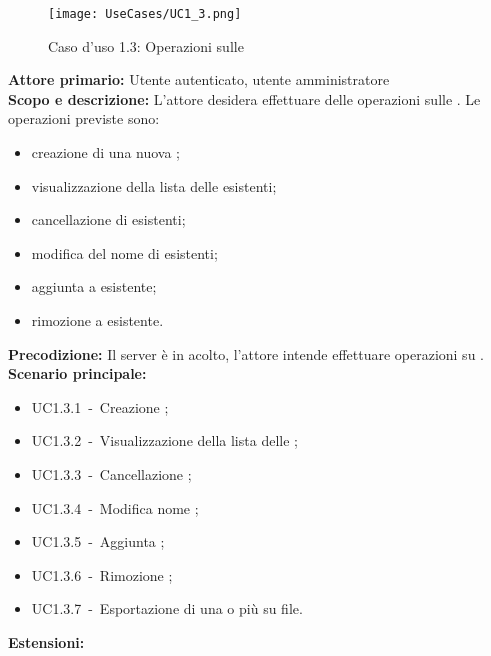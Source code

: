 \documentclass{scalatekids-article}
\begin{document}
\begin{figure}[H]
  \begin{center}
    \texttt{[image: UseCases/UC1\_3.png]}
    \caption{Caso d'uso 1.3: Operazioni sulle }
  \end{center}
\end{figure}
\textbf{Attore primario:} Utente autenticato, utente amministratore\\
\textbf{Scopo e descrizione:} L'attore desidera effettuare delle operazioni sulle . Le operazioni previste sono:
\begin{itemize}
\item creazione di una nuova ;
\item visualizzazione della lista delle  esistenti;
\item cancellazione di  esistenti;
\item modifica del nome di  esistenti;
\item aggiunta  a  esistente;
\item rimozione  a  esistente.
\end{itemize}
\textbf{Precodizione:} Il server è in acolto, l'attore intende effettuare operazioni su .\\
\textbf{Scenario principale:}
\begin{itemize}
\item UC1.3.1\ -\ Creazione ;
\item UC1.3.2\ -\ Visualizzazione della lista delle ;
\item UC1.3.3\ -\ Cancellazione ;
\item UC1.3.4\ -\ Modifica nome ;
\item UC1.3.5\ -\ Aggiunta ;
\item UC1.3.6\ -\ Rimozione ;
\item UC1.3.7\ -\ Esportazione di una o più  su file.
\end{itemize}
\textbf{Estensioni:}
\end{document}
